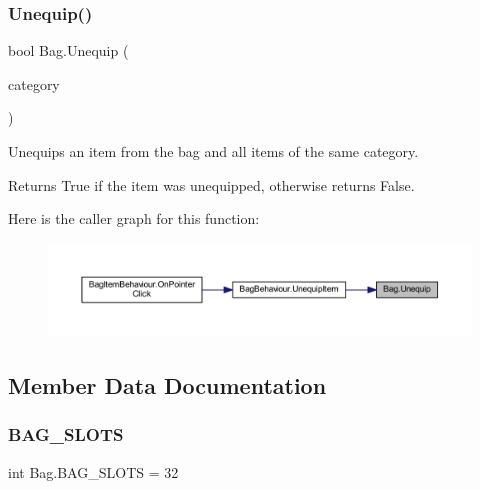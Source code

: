 \subsubsection{\texorpdfstring{Unequip()}{Unequip()}}
{\footnotesize\ttfamily bool Bag.\+Unequip (\begin{DoxyParamCaption}\item[{\mbox{\hyperlink{class_base_item_a882a2962396f880c2e23755437245d37}{Base\+Item.\+Category}}}]{category }\end{DoxyParamCaption})}



Unequips an item from the bag and all items of the same category. 

\begin{DoxyReturn}{Returns}
True if the item was unequipped, otherwise returns False.
\end{DoxyReturn}
Here is the caller graph for this function\+:
\nopagebreak
\begin{figure}[H]
\begin{center}
\leavevmode
\includegraphics[width=350pt]{class_bag_aacb4579a06f66e1578327635e2120b3e_icgraph}
\end{center}
\end{figure}


\subsection{Member Data Documentation}
\mbox{\label{class_bag_aa3277af2938bf5bc9447535318668ced}} 
\subsubsection{\texorpdfstring{BAG\_SLOTS}{BAG\_SLOTS}}
{\footnotesize\ttfamily int Bag.\+B\+A\+G\+\_\+\+S\+L\+O\+TS = 32\hspace{0.3cm}{\ttfamily [static]}}

\mbox{\label{class_bag_ac513120e71acce6fffca5d0e78733182}} 
